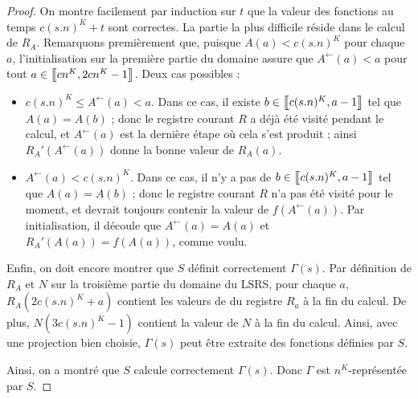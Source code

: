 \documentclass{article}
\begin{document}
\begin{proof}
			On montre facilement par induction sur $t$ que la valeur des fonctions au temps $c(s.n)^K+t$ sont correctes. La partie la plus difficile réside dans le calcul de $R_A$. Remarquons premièrement que, puisque $A(a) < c(s.n)^K$ pour chaque $a$, l'initialisation sur la première partie du domaine assure que $A^{\leftarrow}(a) < a$ pour tout $a \in \left[\!\!\>\!\left[ cn^K , 2cn^K-1 \right]\!\!\>\!\right]$. Deux cas possibles :
			
			\begin{itemize}[itemsep=-1mm]
				\item 	
					$c(s.n)^K \leqslant A^{\leftarrow}(a) < a$. Dans ce cas, il existe $b \in \left[\!\!\>\!\left[ c(s.n)^K , a-1 \right]\!\!\>\!\right]$ tel que $A(a) = A(b)$ ; donc le registre courant $R$ a déjà été visité pendant le calcul, et $A^{\leftarrow}(a)$ est la dernière étape où cela s'est produit ; ainsi $R_A'\left(A^{\leftarrow}(a)\right)$ donne la bonne valeur de $R_A(a)$.
					
				\item 
					$A^{\leftarrow}(a) < c(s.n)^K$. Dans ce cas, il n'y a pas de $b \in \left[\!\!\>\!\left[ c(s.n)^K , a-1 \right]\!\!\>\!\right]$ tel que $A(a) = A(b)$ ; donc le registre courant $R$ n'a pas été visité pour le moment, et devrait toujours contenir la valeur de $f(A^{\leftarrow}(a))$\footnotemark. Par initialisation, il découle que $A^{\leftarrow}(a) = A(a)$ et $R_A'(A(a)) = f(A(a))$, comme voulu.
					
			\end{itemize}
			
			Enfin, on doit encore montrer que $S$ définit correctement $\Gamma(s)$. Par définition de $R_A$ et $N$ sur la troisième partie du domaine du LSRS, pour chaque $a$, $R_A\left( 2 c(s.n)^K + a \right)$ contient les valeurs de du registre $R_a$ à la fin du calcul. De plus, $N(3c(s.n)^K-1)$ contient la valeur de $N$ à la fin du calcul. Ainsi, avec une projection bien choisie, $\Gamma(s)$ peut être extraite des fonctions définies par $S$. 
			
			Ainsi, on a montré que $S$ calcule correctement $\Gamma(s)$. Donc $\Gamma$ est $n^K$-représentée par $S$.
			
		\end{proof}

	
		
		
		
	
\end{document}
